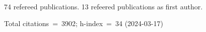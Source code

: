 74 refereed publications. 13 refeered publications as first author.

Total citations~=~3902; h-index~=~34 (2024-03-17)
